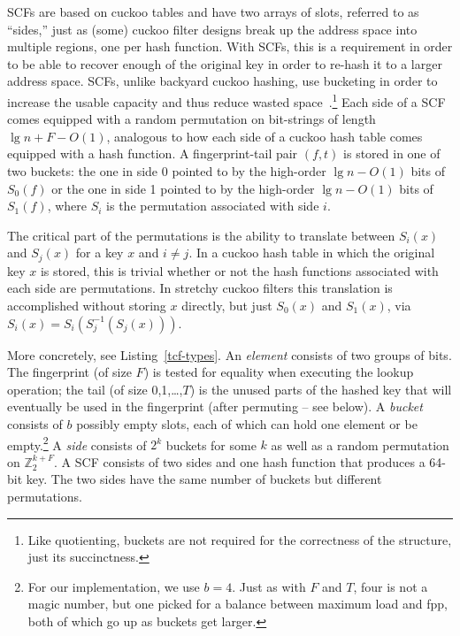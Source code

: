 \documentclass[letterpaper,twocolumn,10pt]{article}
\newcommand{\ints}{\mathbb{Z}}
\newcommand{\taffy}{stretchy}
\newcommand{\Taffy}{Stretchy}
\newcommand{\TCF}{SCF}
\newcommand{\taffy}{taffy}
\newcommand{\Taffy}{Taffy}
\newcommand{\TCF}{TCF}
\begin{document}


\TCF{}s are based on cuckoo tables and have two arrays of slots, referred to as ``sides,'' just as (some) cuckoo filter designs break up the address space into multiple regions, one per hash function.
With \TCF{}s, this is a requirement in order to be able to recover enough of the original key in order to re-hash it to a larger address space.
\TCF{}s, unlike backyard cuckoo hashing, use bucketing in order to increase the usable capacity and thus reduce wasted space~\cite{backyard,buckets}.\footnote{Like quotienting, buckets are not required for the correctness of the structure, just its succinctness.}
Each side of a \TCF{} comes equipped with a random permutation on bit-strings of length $\lg n + F - O(1)$, analogous to how each side of a cuckoo hash table comes equipped with a hash function.
A fingerprint-tail pair $(f, t)$ is stored in one of two buckets: the one in side 0 pointed to by the high-order $\lg n - O(1)$ bits of $S_0(f)$ or the one in side 1 pointed to by the high-order $\lg n - O(1)$ bits of $S_1(f)$, where $S_i$ is the permutation associated with side $i$.

The critical part of the permutations is the ability to translate between $S_i(x)$ and $S_j(x)$ for a key $x$ and $i \ne j$.
In a cuckoo hash table in which the original key $x$ is stored, this is trivial whether or not the hash functions associated with each side are permutations.
In \taffy{} cuckoo filters this translation is accomplished without storing $x$ directly, but just $S_0(x)$ and $S_1(x)$, via $S_i(x) = S_i(S_j^{-1}(S_j(x)))$.


More concretely, see Listing~\ref{tcf-types}.
An {\em element} consists of two groups of bits.
The fingerprint (of size $F$) is tested for equality when executing the lookup operation; the tail (of size 0,1,\dots,$T$) is the unused parts of the hashed key that will eventually be used in the fingerprint (after permuting -- see below).
A {\em bucket} consists of $b$ possibly empty slots, each of which can hold one element or be empty.\footnote{
For our implementation, we use $b = 4$.
Just as with $F$ and $T$, four is not a magic number, but one picked for a balance between maximum load and fpp, both of which go up as buckets get larger.
}
A {\em side} consists of $2^k$ buckets for some $k$ as well as a random permutation on $\ints_2^{k+F}$. %
A \TCF{} consists of two sides and one hash function that produces a 64-bit key.
The two sides have the same number of buckets but different permutations.
\end{document}
